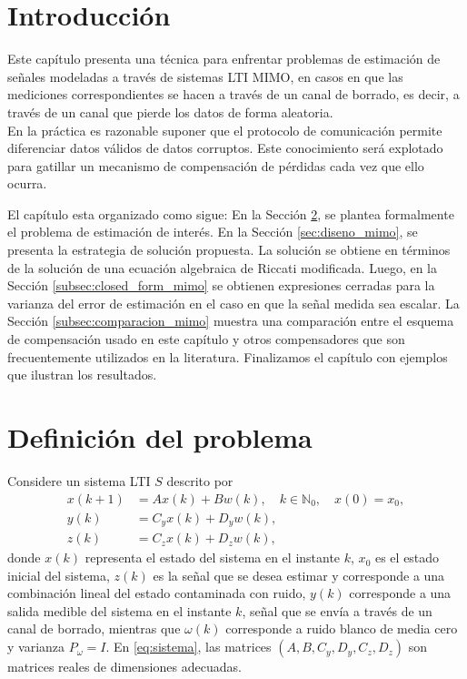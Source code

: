 \section{Introducci\'on}
Este cap\'itulo presenta una t\'ecnica para enfrentar problemas de estimaci\'on de se\~nales modeladas a trav\'es de sistemas LTI MIMO, en casos en que las mediciones correspondientes se hacen a trav\'es de un canal de borrado, es decir, a trav\'es de un canal que pierde los datos de forma aleatoria.
\\ \noindent
En la pr\'actica es razonable suponer que el protocolo de comunicaci\'on permite diferenciar datos v\'alidos de datos corruptos. Este conocimiento ser\'a explotado para gatillar un mecanismo de compensaci\'on de p\'erdidas cada vez que ello ocurra.

El cap\'itulo esta organizado como sigue: En la Secci\'on \ref{sec:def_prob_mimo}, se plantea formalmente el problema de estimaci\'on de inter\'es. En la Secci\'on \ref{sec:diseno_mimo}, se 
presenta la estrategia de soluci\'on propuesta. La soluci\'on se obtiene en t\'erminos de la soluci\'on de una ecuaci\'on algebraica de Riccati modificada. Luego, en la Secci\'on \ref{subsec:closed_form_mimo} se obtienen expresiones cerradas para la varianza del error de estimaci\'on en el caso en que la se\~nal medida sea escalar. La Secci\'on \ref{subsec:comparacion_mimo} muestra una comparaci\'on entre el esquema de compensaci\'on usado en este cap\'itulo y otros compensadores que son frecuentemente utilizados en la literatura. Finalizamos el cap\'itulo con ejemplos que ilustran los resultados.

\section{Definici\'on del problema}
\label{sec:def_prob_mimo}
Considere un sistema LTI $S$ descrito por
\begin{subequations}\label{eq:sistema}
\begin{align}
x(k+1)&=Ax(k)+Bw(k), \quad k \in \mathbb{N}_{0}, \quad x(0)=x_{0},\\
y(k)&=C_{y}x(k)+D_{y}w(k),\\
z(k)&=C_{z}x(k)+D_{z}w(k),
\end{align}
\end{subequations}
donde $x(k)$ representa el estado del sistema en el instante $k$, $x_{0}$ es el estado inicial del sistema, $z(k)$ es la se\~nal que se desea estimar y corresponde a una combinaci\'on lineal del estado contaminada con ruido, $y(k)$ corresponde a una salida medible del sistema en el instante $k$, se\~nal que se env\'ia a trav\'es de un canal de borrado, mientras que $\omega(k)$ corresponde a ruido blanco de media cero y varianza $P_{\omega}=I$. En \eqref{eq:sistema}, las matrices $(A,B,C_{y},D_{y},C_{z},D_{z})$ son matrices reales de dimensiones adecuadas.

